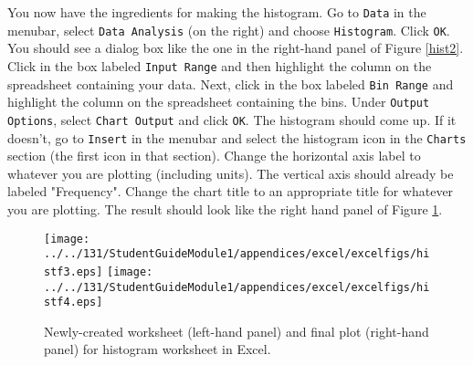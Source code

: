You now have the ingredients for making the histogram.
Go to {\tt Data} in the menubar, select {\tt Data Analysis} (on the right) and 
choose {\tt Histogram}. Click {\tt OK}.
You should see a dialog box like the one in the right-hand panel of  Figure \ref{hist2}.
Click in the box labeled {\tt Input Range} and then highlight the column on the spreadsheet containing your data.
Next, click in the box labeled {\tt Bin Range} and highlight the column on the spreadsheet containing the bins.
Under {\tt Output Options}, select {\tt Chart Output} and click {\tt OK}. The histogram should come up. 
If it doesn't, go to {\tt Insert} in the menubar and select 
the histogram icon in the {\tt Charts} section (the first icon in that section).
Change the horizontal axis label to whatever you are plotting (including units). The vertical axis should already be labeled "Frequency".
Change the chart title to an appropriate title for whatever you are plotting. 
The result should look like the right hand panel of Figure \ref{hist5}.
\begin{figure}[b!]
\begin{center}
\texttt{[image: ../../131/StudentGuideModule1/appendices/excel/excelfigs/histf3.eps]}
\hspace{0.4in}
\texttt{[image: ../../131/StudentGuideModule1/appendices/excel/excelfigs/histf4.eps]}
\caption{Newly-created worksheet (left-hand panel) and final plot (right-hand panel) for  histogram worksheet in Excel.}\label{hist5}
\end{center}
\end{figure}

\newpage

